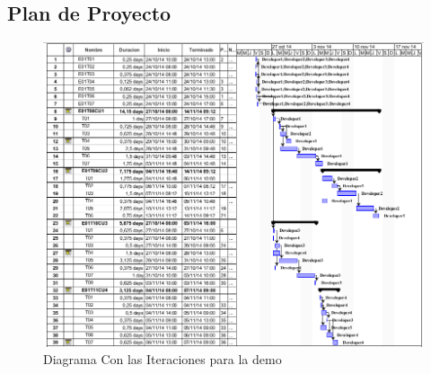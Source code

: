 \subsection{Plan de Proyecto}

\begin{figure}[h!]
  \centering
  \includegraphics[width=1\textwidth]{plan.png}
  \caption{Diagrama Con las Iteraciones para la demo}
  \label{fig:clases4}
\end{figure}
